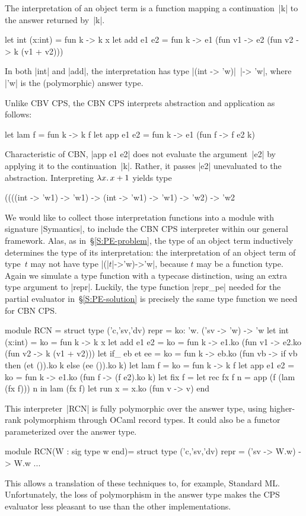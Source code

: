 The interpretation of an object term is a function
mapping a continuation~|k| to the answer
returned by~|k|.
\begin{code}
let int (x:int) = fun k -> k x
let add e1 e2 = fun k -> e1 (fun v1 -> e2 (fun v2 -> k (v1 + v2)))
\end{code}
In both |int| and |add|, the interpretation has type 
|(int -> 'w)|\texttt{ }|-> 'w|, where |'w| is the (polymorphic) answer type.

Unlike CBV CPS, the CBN CPS interprets
abstraction and application as follows:
\begin{code}
let lam f = fun k -> k f
let app e1 e2 = fun k -> e1 (fun f -> f e2 k)
\end{code}
Characteristic of CBN, |app e1 e2|
does not evaluate the argument~|e2| by applying it to the
continuation~|k|. Rather, it passes |e2| unevaluated to the abstraction.
Interpreting $\mathopen{\lambda\mathord{x}.\,} x+1$ yields type
\begin{code}
((((int -> 'w1) -> 'w1) -> (int -> 'w1) -> 'w1) -> 'w2) -> 'w2
\end{code}

We would like to collect those interpretation functions into a module
with signature |Symantics|, to include the CBN CPS interpreter within our
general framework. Alas, as in~\S\ref{S:PE-problem}, the type of
an object term inductively determines the type of its interpretation:
the interpretation of an object term of type~$t$ may not have type
|(|$t$|->'w)->'w|, because $t$ may be a function type.  Again we
simulate a type function with a typecase distinction, using an extra
type argument to |repr|. Luckily, the type function |repr_pe| needed for
the partial evaluator 
in~\S\ref{S:PE-solution} is precisely the same type function we
need for CBN CPS\@.
\begin{code}
module RCN = struct
  type ('c,'sv,'dv) repr = {ko: 'w. ('sv -> 'w) -> 'w}
  let int (x:int) = {ko = fun k -> k x}
  let add e1 e2 = {ko = fun k ->
      e1.ko (fun v1 -> e2.ko (fun v2 -> k (v1 + v2)))}
  let if_ eb et ee = {ko = fun k ->
      eb.ko (fun vb -> if vb then (et ()).ko k else (ee ()).ko k)}
  let lam f = {ko = fun k -> k f}
  let app e1 e2 = {ko = fun k -> e1.ko (fun f -> (f e2).ko k)}
  let fix f = let rec fx f n = app (f (lam (fx f))) n in lam (fx f)
  let run x = x.ko (fun v -> v)
end
\end{code}

This interpreter~|RCN| is fully polymorphic over the answer type,
using higher-rank polymorphism through OCaml record types.
It could also be a functor parameterized over
the answer type.
\begin{code}
module RCN(W : sig type w end)= struct
  type ('c,'sv,'dv) repr = ('sv -> W.w) -> W.w
  ...
\end{code}
This allows a translation of these techniques to, for example, Standard ML.
Unfortunately, the loss of polymorphism in the answer type makes the 
CPS evaluator less pleasant to use than the other implementations.

